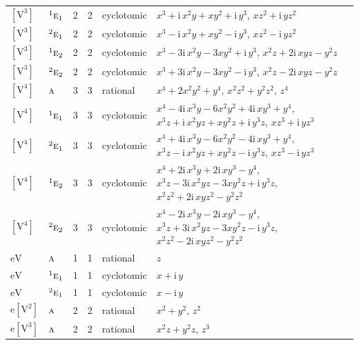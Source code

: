 \documentclass[10pt,a4paper]{article}
\numberwithin{equation}{section}
\newcommand{\irr}[1]{\text{\normalfont\scshape #1}}
\newcommand{\conjpair}[1]{{}^{#1}}
\newcommand{\iunit}{\mathrm{i}}
\newcommand{\jahn}[1]{\mathrm{#1}}
\newlength{\fillwidth}\newlength{\cellwidth}\newlength{\colwidth}
\begin{document}
{\begin{longtable}{@{}llrrl>{\RaggedRight\arraybackslash}p{\fillwidth}@{}}
$\jahn{[V^{3}]}$ & $\conjpair{1}\irr{e}_{1}$ & 2 & 2 & cyclotomic & $x^{3} + \iunit{}\,x^{2}y + xy^{2} + \iunit{}\,y^{3}$, $xz^{2} + \iunit{}\,yz^{2}$\\
$\jahn{[V^{3}]}$ & $\conjpair{2}\irr{e}_{1}$ & 2 & 2 & cyclotomic & $x^{3} - \iunit{}\,x^{2}y + xy^{2} - \iunit{}\,y^{3}$, $xz^{2} - \iunit{}\,yz^{2}$\\
$\jahn{[V^{3}]}$ & $\conjpair{1}\irr{e}_{2}$ & 2 & 2 & cyclotomic & $x^{3} - 3\iunit{}\,x^{2}y - 3xy^{2} + \iunit{}\,y^{3}$, $x^{2}z + 2\iunit{}\,xyz - y^{2}z$\\
$\jahn{[V^{3}]}$ & $\conjpair{2}\irr{e}_{2}$ & 2 & 2 & cyclotomic & $x^{3} + 3\iunit{}\,x^{2}y - 3xy^{2} - \iunit{}\,y^{3}$, $x^{2}z - 2\iunit{}\,xyz - y^{2}z$\\
$\jahn{[V^{4}]}$ & $\irr{a}$ & 3 & 3 & rational & $x^{4} + 2x^{2}y^{2} + y^{4}$, $x^{2}z^{2} + y^{2}z^{2}$, $z^{4}$\\
$\jahn{[V^{4}]}$ & $\conjpair{1}\irr{e}_{1}$ & 3 & 3 & cyclotomic & $x^{4} - 4\iunit{}\,x^{3}y - 6x^{2}y^{2} + 4\iunit{}\,xy^{3} + y^{4}$, $x^{3}z + \iunit{}\,x^{2}yz + xy^{2}z + \iunit{}\,y^{3}z$, $xz^{3} + \iunit{}\,yz^{3}$\\
$\jahn{[V^{4}]}$ & $\conjpair{2}\irr{e}_{1}$ & 3 & 3 & cyclotomic & $x^{4} + 4\iunit{}\,x^{3}y - 6x^{2}y^{2} - 4\iunit{}\,xy^{3} + y^{4}$, $x^{3}z - \iunit{}\,x^{2}yz + xy^{2}z - \iunit{}\,y^{3}z$, $xz^{3} - \iunit{}\,yz^{3}$\\
$\jahn{[V^{4}]}$ & $\conjpair{1}\irr{e}_{2}$ & 3 & 3 & cyclotomic & $x^{4} + 2\iunit{}\,x^{3}y + 2\iunit{}\,xy^{3} - y^{4}$, $x^{3}z - 3\iunit{}\,x^{2}yz - 3xy^{2}z + \iunit{}\,y^{3}z$, $x^{2}z^{2} + 2\iunit{}\,xyz^{2} - y^{2}z^{2}$\\
$\jahn{[V^{4}]}$ & $\conjpair{2}\irr{e}_{2}$ & 3 & 3 & cyclotomic & $x^{4} - 2\iunit{}\,x^{3}y - 2\iunit{}\,xy^{3} - y^{4}$, $x^{3}z + 3\iunit{}\,x^{2}yz - 3xy^{2}z - \iunit{}\,y^{3}z$, $x^{2}z^{2} - 2\iunit{}\,xyz^{2} - y^{2}z^{2}$\\
$\jahn{eV}$ & $\irr{a}$ & 1 & 1 & rational & $z$\\
$\jahn{eV}$ & $\conjpair{1}\irr{e}_{1}$ & 1 & 1 & cyclotomic & $x + \iunit{}\,y$\\
$\jahn{eV}$ & $\conjpair{2}\irr{e}_{1}$ & 1 & 1 & cyclotomic & $x - \iunit{}\,y$\\
$\jahn{e[V^{2}]}$ & $\irr{a}$ & 2 & 2 & rational & $x^{2} + y^{2}$, $z^{2}$\\
$\jahn{e[V^{3}]}$ & $\irr{a}$ & 2 & 2 & rational & $x^{2}z + y^{2}z$, $z^{3}$\\

\end{longtable}}
\end{document}
